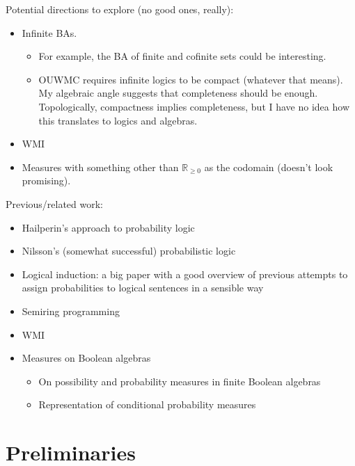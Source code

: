 \documentclass{article}
\theoremstyle{definition}
\theoremstyle{remark}
\begin{document}
Potential directions to explore (no good ones, really):
\begin{itemize}
\item Infinite BAs.
  \begin{itemize}
  \item For example, the BA of finite and cofinite sets could be interesting.
  \item OUWMC requires infinite logics to be compact (whatever that means). My
    algebraic angle suggests that completeness should be enough. Topologically,
    compactness implies completeness, but I have no idea how this translates to
    logics and algebras.
  \end{itemize}
\item WMI
\item Measures with something other than $\mathbb{R}_{\ge 0}$ as the codomain
  (doesn't look promising).
\end{itemize}

Previous/related work:
\begin{itemize}
\item Hailperin's approach to probability logic
  \cite{DBLP:journals/ndjfl/Hailperin84}
\item Nilsson's (somewhat successful) probabilistic logic
  \cite{DBLP:journals/ai/Nilsson86}
\item Logical induction: a big paper with a good overview of previous attempts
  to assign probabilities to logical sentences in a sensible way
  \cite{DBLP:journals/eccc/GarrabrantBCST16}
\item Semiring programming \cite{DBLP:journals/corr/BelleR16}
\item WMI \cite{DBLP:conf/ijcai/BellePB15}
\item Measures on Boolean algebras
  \begin{itemize}
  \item On possibility and probability measures in finite Boolean algebras
    \cite{DBLP:journals/soco/CastineiraCT02}
  \item Representation of conditional probability measures
    \cite{krauss1968representation}
  \end{itemize}
\end{itemize}

\section{Preliminaries}
\end{document}

